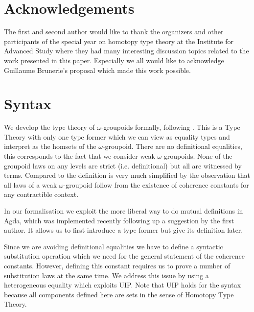 \documentclass{acm_proc_article-sp}
\begin{document}
\section*{Acknowledgements}

The first and second author would like to thank the organizers and
other participants of the special year on homotopy type theory at the
Institute for Advanced Study where they had many interesting
discussion topics related to the work presented in this
paper. Especially we all would like to acknowledge Guillaume
Brunerie's proposal which made this work possible. 




\section{Syntax}\label{sec:syntax}

We develop the type theory of $\omega$-groupoids formally, following
\cite{gb:wog}. This is a Type Theory with only one type former which
we can view as equality types and interpret as the homsets of the
$\omega$-groupoid. There are no definitional equalities, this
corresponds to the fact that we consider weak $\omega$-groupoids. None of the groupoid laws on any levels are strict (i.e. definitional) but all are witnessed by
terms. Compared to \cite{txa:csl} the definition is very much
simplified by the observation that all laws of a weak $\omega$-groupoid follow from the existence of coherence constants for
any contractible context.

In our formalisation we exploit the more liberal way to do mutual
definitions in Agda, which was implemented recently following up a
suggestion by the first author. It allows us to first introduce a type
former but give its definition later.

Since we are avoiding definitional equalities we have to define a
syntactic substitution operation which we need for the general
statement of the coherence constants. However, defining this constant
requires us to prove a number of substitution laws at the same
time. We address this issue by using a heterogeneous equality which
exploits UIP. Note that UIP holds for
the syntax because all components defined here
are sets in the sense of Homotopy Type Theory.

\end{document}
